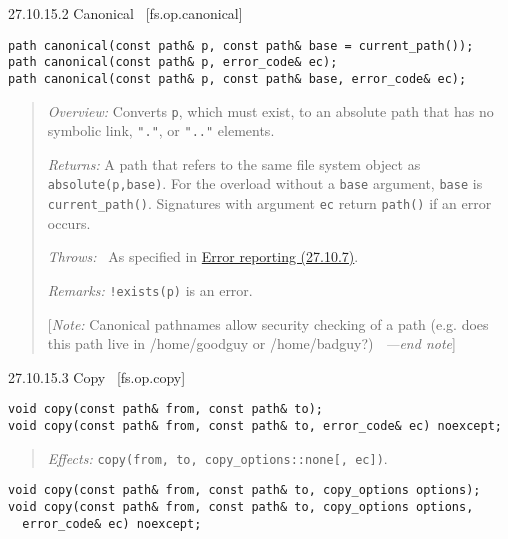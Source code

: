 27.10.15.2 Canonical~ {[}fs.op.canonical{]}

\begin{verbatim}
path canonical(const path& p, const path& base = current_path());
path canonical(const path& p, error_code& ec);
path canonical(const path& p, const path& base, error_code& ec);
\end{verbatim}

\begin{quote}
\emph{Overview:} Converts \texttt{p}, which must exist, to an absolute
path that has no symbolic link, \texttt{"."}, or \texttt{".."} elements.

\emph{Returns:} A path that refers to the same file system object as
\texttt{absolute(p,base)}. For the overload without a \texttt{base}
argument, \texttt{base} is \texttt{current\_path()}. Signatures with
argument \texttt{ec} return \texttt{path()} if an error occurs.

\emph{Throws:}~ As specified in \hyperref[Error-reporting]{Error
reporting (27.10.7)}.

\emph{Remarks:} \texttt{!exists(p)} is an error.

{[}\emph{Note:} Canonical pathnames allow security checking of a path
(e.g. does this path live in /home/goodguy or /home/badguy?)~
\emph{---end note}{]}
\end{quote}

27.10.15.3 Copy~ {[}fs.op.copy{]}

\begin{verbatim}
void copy(const path& from, const path& to);
void copy(const path& from, const path& to, error_code& ec) noexcept;
\end{verbatim}

\begin{quote}
\emph{Effects:}
\texttt{copy(from,\ to,\ copy\_options::none{[},\ ec{]})}.
\end{quote}

\begin{verbatim}
void copy(const path& from, const path& to, copy_options options);
void copy(const path& from, const path& to, copy_options options,
  error_code& ec) noexcept;
\end{verbatim}

